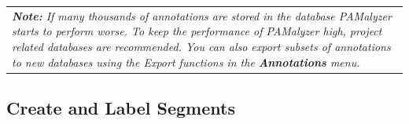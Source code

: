 \documentclass{scrartcl}
\begin{document}
\begin{table}[ht!]
	\centering
	\begin{tabular}{p{}}
\textit{\textbf{Note:}
	If many thousands of annotations are stored in the database PAMalyzer starts to perform worse. 
	To keep the performance of PAMalyzer high, project related databases are recommended.
You can also export subsets of annotations to new databases using the Export functions in the \textbf{Annotations} menu.}
	\end{tabular}
\end{table}

\subsection{Create and Label Segments}\label{sec:labelSegments}
\end{document}
